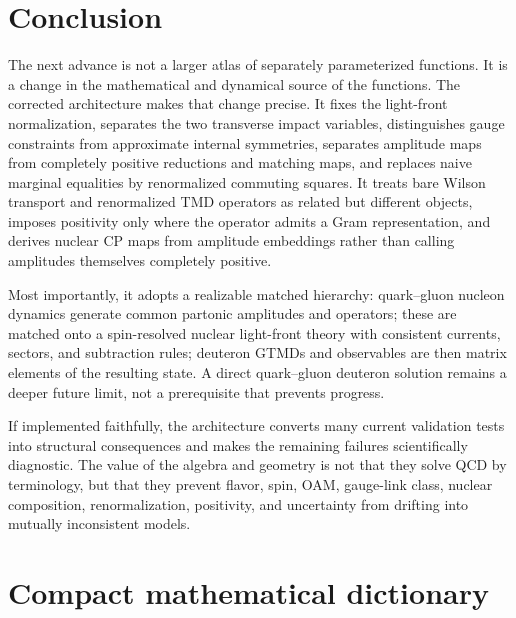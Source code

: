 \documentclass[11pt]{article}
\begin{document}
\section{Conclusion}

The next advance is not a larger atlas of separately parameterized functions.
It is a change in the mathematical and dynamical source of the functions.
The corrected architecture makes that change precise.  It fixes the
light-front normalization, separates the two transverse impact variables,
distinguishes gauge constraints from approximate internal symmetries,
separates amplitude maps from completely positive reductions and matching
maps, and replaces naive marginal equalities by renormalized commuting
squares.  It treats bare Wilson transport and renormalized TMD operators as
related but different objects, imposes positivity only where the operator
admits a Gram representation, and derives nuclear CP maps from amplitude
embeddings rather than calling amplitudes themselves completely positive.

Most importantly, it adopts a realizable matched hierarchy: quark--gluon
nucleon dynamics generate common partonic amplitudes and operators; these are
matched onto a spin-resolved nuclear light-front theory with consistent
currents, sectors, and subtraction rules; deuteron GTMDs and observables are
then matrix elements of the resulting state.  A direct quark--gluon deuteron
solution remains a deeper future limit, not a prerequisite that prevents
progress.

If implemented faithfully, the architecture converts many current validation
tests into structural consequences and makes the remaining failures
scientifically diagnostic.  The value of the algebra and geometry is not that
they solve QCD by terminology, but that they prevent flavor, spin, OAM,
gauge-link class, nuclear composition, renormalization, positivity, and
uncertainty from drifting into mutually inconsistent models.

\appendix

\section{Compact mathematical dictionary}
\label{app:dictionary}
\end{document}
